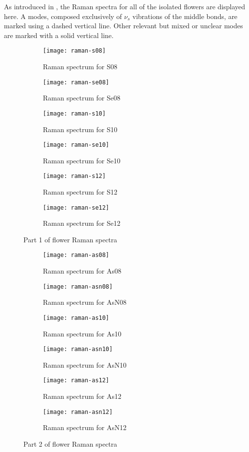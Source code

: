As introduced in , the Raman spectra for all of the isolated flowers are displayed here.
A modes, composed exclusively of $\nu_s$ vibrations of the middle bonds, are marked using a dashed vertical line.
Other relevant but mixed or unclear modes are marked with a solid vertical line.

\begin{figure*}[h]
\centering
\begin{subfigure}{8.25cm}\centering\texttt{[image: raman-s08]}\caption{Raman spectrum for S08}\end{subfigure}%
\begin{subfigure}{8.25cm}\centering\texttt{[image: raman-se08]}\caption{Raman spectrum for Se08}\end{subfigure}
\begin{subfigure}{8.25cm}\centering\texttt{[image: raman-s10]}\caption{Raman spectrum for S10}\end{subfigure}%
\begin{subfigure}{8.25cm}\centering\texttt{[image: raman-se10]}\caption{Raman spectrum for Se10}\end{subfigure}
\begin{subfigure}{8.25cm}\centering\texttt{[image: raman-s12]}\caption{Raman spectrum for S12}\end{subfigure}%
\begin{subfigure}{8.25cm}\centering\texttt{[image: raman-se12]}\caption{Raman spectrum for Se12}\end{subfigure}
\caption[Part 1 of flower Raman spectra]{Part 1 of flower Raman spectra}
\end{figure*}

\newpage

\begin{figure*}[h]
\centering
\begin{subfigure}{8.25cm}\centering\texttt{[image: raman-as08]}\caption{Raman spectrum for As08}\end{subfigure}%
\begin{subfigure}{8.25cm}\centering\texttt{[image: raman-asn08]}\caption{Raman spectrum for AsN08}\end{subfigure}
\begin{subfigure}{8.25cm}\centering\texttt{[image: raman-as10]}\caption{Raman spectrum for As10}\end{subfigure}%
\begin{subfigure}{8.25cm}\centering\texttt{[image: raman-asn10]}\caption{Raman spectrum for AsN10}\end{subfigure}
\begin{subfigure}{8.25cm}\centering\texttt{[image: raman-as12]}\caption{Raman spectrum for As12}\end{subfigure}%
\begin{subfigure}{8.25cm}\centering\texttt{[image: raman-asn12]}\caption{Raman spectrum for AsN12}\end{subfigure}
\caption[Part 2 of flower Raman spectra]{Part 2 of flower Raman spectra}
\end{figure*}


